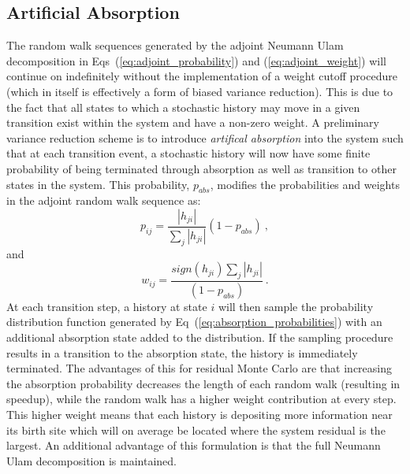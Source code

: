 \subsection{Artificial Absorption}
\label{subsec:artificial_absorption}
The random walk sequences generated by the adjoint Neumann Ulam
decomposition in Eqs~(\ref{eq:adjoint_probability}) and
(\ref{eq:adjoint_weight}) will continue on indefinitely without the
implementation of a weight cutoff procedure (which in itself is
effectively a form of biased variance reduction). This is due to the
fact that all states to which a stochastic history may move in a given
transition exist within the system and have a non-zero weight. A
preliminary variance reduction scheme is to introduce
\textit{artifical absorption} into the system such that at each
transition event, a stochastic history will now have some finite
probability of being terminated through absorption as well as
transition to other states in the system. This probability, $p_{abs}$,
modifies the probabilities and weights in the adjoint random walk
sequence as:
\begin{equation}
  p_{ij} = \frac{|h_{ji}|}{\sum_j|h_{ji}|}(1-p_{abs})\:,
  \label{eq:absorption_probabilities}
\end{equation}
and
\begin{equation}
  w_{ij} = \frac{sign(h_{ji})\sum_j|h_{ji}|}{(1-p_{abs})}\:.
  \label{eq:absorption_weights}
\end{equation}
At each transition step, a history at state $i$ will then sample the
probability distribution function generated by
Eq~(\ref{eq:absorption_probabilities}) with an additional absorption
state added to the distribution. If the sampling procedure results in
a transition to the absorption state, the history is immediately
terminated. The advantages of this for residual Monte Carlo are that
increasing the absorption probability decreases the length of each
random walk (resulting in speedup), while the random walk has a higher
weight contribution at every step. This higher weight means that each
history is depositing more information near its birth site which will
on average be located where the system residual is the largest. An
additional advantage of this formulation is that the full Neumann Ulam
decomposition is maintained.

